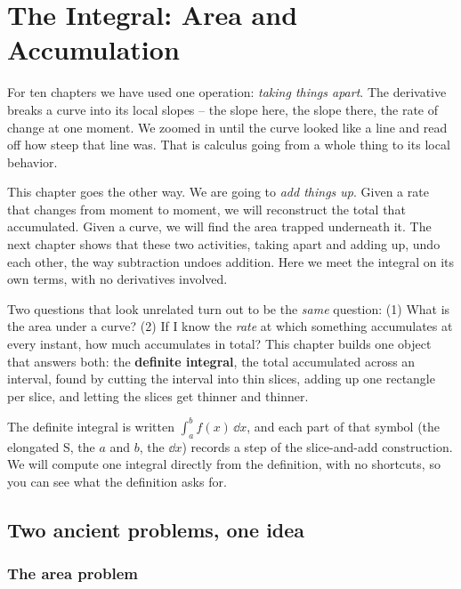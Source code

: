 \chapter{The Integral: Area and Accumulation}

For ten chapters we have used one operation: \emph{taking things
apart}. The derivative breaks a curve into its local slopes -- the slope here,
the slope there, the rate of change at one moment. We zoomed in until the
curve looked like a line and read off how steep that line was. That is calculus
going from a whole thing to its local behavior.

This chapter goes the other way. We are going to \emph{add things up}.
Given a rate that changes from moment to moment, we will reconstruct the total
that accumulated. Given a curve, we will find the area trapped underneath it.
The next chapter shows that these two activities, taking apart and adding up,
undo each other, the way subtraction undoes addition. Here we meet the integral
on its own terms, with no derivatives involved.

\begin{focusbox}
Two questions that look unrelated turn out to be the \emph{same} question:
(1) What is the area under a curve? (2) If I know the \emph{rate} at which
something accumulates at every instant, how much accumulates in total? This
chapter builds one object that answers both: the \textbf{definite integral},
the total accumulated across an interval, found by cutting the interval into
thin slices, adding up one rectangle per slice, and letting the slices get
thinner and thinner.
\end{focusbox}

The definite integral is written $\int_a^b f(x)\,\dd x$, and each part of
that symbol (the elongated S, the $a$ and $b$, the $\dd x$) records a step of
the slice-and-add construction. We will compute one integral directly from the
definition, with no shortcuts, so you can see what the definition asks for.

\chapterline

\section{Two ancient problems, one idea}
\label{ch20:two-problems}

\subsection{The area problem}


